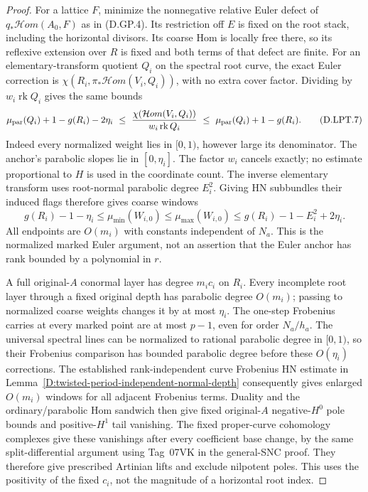 \begin{proof}
For a lattice $F$, minimize the nonnegative relative Euler defect
of $q_*\mathcal Hom(A_0,F)$ as in (D.GP.4). Its restriction off
$E$ is fixed on the root stack, including the horizontal divisors.
Its coarse Hom is locally free there, so its reflexive extension
over $R$ is fixed and both terms of that defect are finite.
For an elementary-transform quotient $Q_i$ on the spectral root
curve, the exact Euler correction is
$\chi(R_i,\pi_*\mathcal Hom(V_i,Q_i))$, with no extra cover
factor. Dividing by $w_i\operatorname{rk}Q_i$ gives the same bounds
\[
 \mu_{\rm par}(Q_i)+1-g(R_i)-2\eta_i
 \ \le\ \frac{\chi(\mathcal Hom(V_i,Q_i))}
                    {w_i\operatorname{rk}Q_i}
 \ \le\ \mu_{\rm par}(Q_i)+1-g(R_i).
 \tag{D.LPT.7}
\]
Indeed every normalized weight lies in $[0,1)$, however large its
denominator. The anchor's parabolic slopes lie in $[0,\eta_i]$.
The factor $w_i$ cancels exactly; no estimate proportional to $H$
is used in the coordinate count. The inverse elementary transform
uses root-normal parabolic degree $E_i^2$. Giving HN subbundles
their induced flags therefore gives coarse windows
\[
 g(R_i)-1-\eta_i\le\mu_{\min}(W_{i,0})
       \le\mu_{\max}(W_{i,0})
       \le g(R_i)-1-E_i^2+2\eta_i.
 \tag{D.LPT.8}
\]
All endpoints are $O(m_i)$ with constants independent of $N_a$.
This is the normalized marked Euler argument, not an assertion
that the Euler anchor has rank bounded by a polynomial in $r$.

A full original-$A$ conormal layer has degree $m_ic_i$ on $R_i$.
Every incomplete root layer through a fixed original depth has
parabolic degree $O(m_i)$; passing to normalized coarse weights
changes it by at most $\eta_i$. The one-step Frobenius carries
at every marked point are at most $p-1$, even for order $N_a/h_a$.
The universal spectral lines can be normalized to rational
parabolic degree in $[0,1)$, so their Frobenius comparison has
bounded parabolic degree before these $O(\eta_i)$ corrections.
The established rank-independent curve Frobenius HN estimate in
Lemma~\ref{D:twisted-period-independent-normal-depth} consequently
gives enlarged $O(m_i)$ windows for all adjacent Frobenius terms.
Duality and the ordinary/parabolic Hom sandwich then give fixed
original-$A$ negative-$H^0$ pole bounds and positive-$H^1$ tail
vanishing. The fixed proper-curve cohomology complexes give these
vanishings after every coefficient base change, by the same
split-differential argument using Tag~07VK in the general-SNC
proof. They therefore give prescribed Artinian lifts and exclude
nilpotent poles. This uses the positivity of the fixed $c_i$,
not the magnitude of a horizontal root index.


\end{proof}
